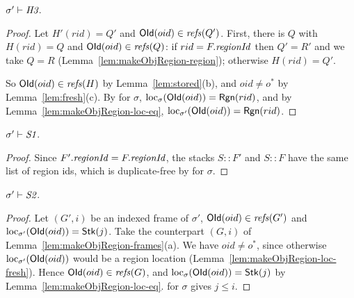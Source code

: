 \begin{lemma}[\inv{H3}] 
$\sigma' \vdash \textit{H3}$.
\end{lemma}
\begin{proof}
Let $H'(rid) = Q'$ and $\mathsf{OId}(oid) \in \mathit{refs}(Q')$. First, there is $Q$ with $H(rid) = Q$ and
$\mathsf{OId}(oid) \in \mathit{refs}(Q)$: if $rid = F.\mathit{regionId}$ then $Q' = R'$ and we take $Q = R$
(Lemma~\ref{lem:makeObjRegion-region}); otherwise $H(rid) = Q'$.

So $\mathsf{OId}(oid) \in \mathit{refs}(H)$ by Lemma~\ref{lem:stored}(b), and $oid \ne o^*$ by
Lemma~\ref{lem:fresh}(c). By  for $\sigma$, $\mathrm{loc}_{\sigma}(\mathsf{OId}(oid)) = \mathsf{Rgn}(rid)$, and by
Lemma~\ref{lem:makeObjRegion-loc-eq}, $\mathrm{loc}_{\sigma'}(\mathsf{OId}(oid)) = \mathsf{Rgn}(rid)$.
\end{proof}

\begin{lemma}[\inv{S1}] 
$\sigma' \vdash \textit{S1}$.
\end{lemma}
\begin{proof}
Since $F'.\mathit{regionId} = F.\mathit{regionId}$, the stacks $S :: F'$ and $S :: F$ have the same list of region ids, which
is duplicate-free by  for $\sigma$.
\end{proof}

\begin{lemma}[\inv{S2}] 
$\sigma' \vdash \textit{S2}$.
\end{lemma}
\begin{proof}
Let $(G', i)$ be an indexed frame of $\sigma'$, $\mathsf{OId}(oid) \in \mathit{refs}(G')$ and
$\mathrm{loc}_{\sigma'}(\mathsf{OId}(oid)) = \mathsf{Stk}(j)$. Take the counterpart $(G, i)$ of
Lemma~\ref{lem:makeObjRegion-frames}(a). We have $oid \ne o^*$, since otherwise
$\mathrm{loc}_{\sigma'}(\mathsf{OId}(oid))$ would be a region location
(Lemma~\ref{lem:makeObjRegion-loc-fresh}). Hence $\mathsf{OId}(oid) \in \mathit{refs}(G)$, and
$\mathrm{loc}_{\sigma}(\mathsf{OId}(oid)) = \mathsf{Stk}(j)$ by Lemma~\ref{lem:makeObjRegion-loc-eq}.  for $\sigma$
gives $j \le i$.
\end{proof}

